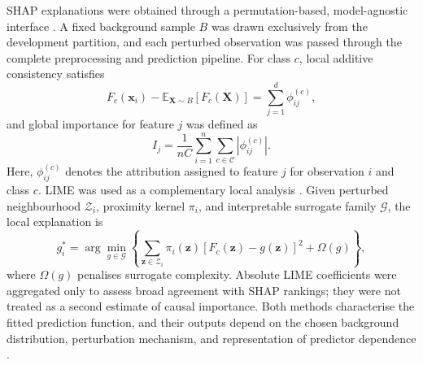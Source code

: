 \documentclass[a4paper,fleqn]{cas-dc}
\begin{document}
SHAP explanations were obtained through a permutation-based, model-agnostic interface \cite{lundberg2017}. A fixed background sample $B$ was drawn exclusively from the development partition, and each perturbed observation was passed through the complete preprocessing and prediction pipeline. For class $c$, local additive consistency satisfies
\begin{equation}
F_c(\mathbf{x}_i)-\mathbb{E}_{\mathbf{X}\sim B}[F_c(\mathbf{X})]
=\sum_{j=1}^{d}\phi_{ij}^{(c)},
\label{eq:shaplocal}
\end{equation}
and global importance for feature $j$ was defined as
\begin{equation}
I_j=\frac{1}{nC}\sum_{i=1}^{n}\sum_{c\in\mathcal{C}}|\phi_{ij}^{(c)}|.
\label{eq:shapglobal}
\end{equation}
Here, $\phi_{ij}^{(c)}$ denotes the attribution assigned to feature $j$ for observation $i$ and class $c$. LIME was used as a complementary local analysis \cite{ribeiro2016}. Given perturbed neighbourhood $\mathcal{Z}_i$, proximity kernel $\pi_i$, and interpretable surrogate family $\mathcal{G}$, the local explanation is
\begin{equation}
g_i^{*}=\arg\min_{g\in\mathcal{G}}
\left\{\sum_{\mathbf{z}\in\mathcal{Z}_i}\pi_i(\mathbf{z})
[F_c(\mathbf{z})-g(\mathbf{z})]^2+\Omega(g)\right\},
\label{eq:lime}
\end{equation}
where $\Omega(g)$ penalises surrogate complexity. Absolute LIME coefficients were aggregated only to assess broad agreement with SHAP rankings; they were not treated as a second estimate of causal importance. Both methods characterise the fitted prediction function, and their outputs depend on the chosen background distribution, perturbation mechanism, and representation of predictor dependence \cite{instanceshap2023,jung2023}.
\end{document}

